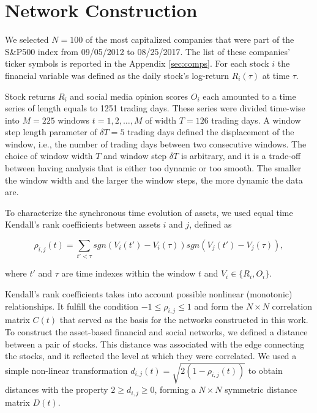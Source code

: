 \documentclass[]{book}
\theoremstyle{definition}
\theoremstyle{definition}
\theoremstyle{definition}
\theoremstyle{remark}
\begin{document}
\section{Network Construction}\label{network-construction}

We selected \(N = 100\) of the most capitalized companies that were part
of the S\&P500 index from 09/05/2012 to 08/25/2017. The list of these
companies' ticker symbols is reported in the Appendix \ref{sec:comps}.
For each stock \(i\) the financial variable was defined as the daily
stock's log-return \(R_i(\tau)\) at time \(\tau\).

Stock returns \(R_i\) and social media opinion scores \(O_i\) each
amounted to a time series of length equals to 1251 trading days. These
series were divided time-wise into \(M = 225\) windows
\(t = 1, 2, \ldots, M\) of width \(T = 126\) trading days. A window step
length parameter of \(\delta T = 5\) trading days defined the
displacement of the window, i.e., the number of trading days between two
consecutive windows. The choice of window width \(T\) and window step
\(\delta T\) is arbitrary, and it is a trade-off between having analysis
that is either too dynamic or too smooth. The smaller the window width
and the larger the window steps, the more dynamic the data are.

To characterize the synchronous time evolution of assets, we used equal
time Kendall's rank coefficients between assets \(i\) and \(j\), defined
as

\begin{equation}
 \rho_{i, j}(t) = \sum\limits_{t' < \tau}sgn(V_i(t') - V_i(\tau))sgn(V_j(t') - V_j(\tau)),
\end{equation}

where \(t'\) and \(\tau\) are time indexes within the window \(t\) and
\(V_i \in \{R_i, O_i\}\).

Kendall's rank coefficients takes into account possible nonlinear
(monotonic) relationships. It fulfill the condition
\(-1 \leq \rho_{i, j} \leq 1\) and form the \(N \times N\) correlation
matrix \(C(t)\) that served as the basis for the networks constructed in
this work. To construct the asset-based financial and social networks,
we defined a distance between a pair of stocks. This distance was
associated with the edge connecting the stocks, and it reflected the
level at which they were correlated. We used a simple non-linear
transformation \(d_{i, j}(t) = \sqrt{2(1 - \rho_{i,j}(t))}\) to obtain
distances with the property \(2 \geq d_{i,j} \geq 0\), forming a
\(N \times N\) symmetric distance matrix \(D(t)\).
\end{document}
